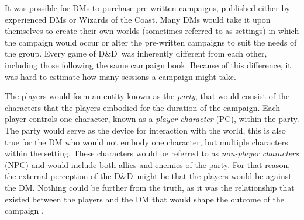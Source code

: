 \documentclass[final]{cmpreport}
\newcommand{\WotC}{Wizards of the Coast}
\newcommand{\dnd}{D\&D}
\begin{document}
			It was possible for DMs to purchase pre-written campaigns, published either by experienced DMs or \WotC. Many DMs would take it upon themselves to create their own worlds (sometimes referred to as settings) in which the campaign would occur or alter the pre-written campaigns to suit the needs of the group. Every game of \dnd \ was inherently different from each other, including those following the same campaign book. Because of this difference, it was hard to estimate how many sessions a campaign might take. 
			
			The players would form an entity known as the \emph{party}, that would consist of the characters that the players embodied for the duration of the campaign. Each player controls one character, known as a \emph{player character} (PC), within the party. The party would serve as the device for interaction with the world, this is also true for the DM who would not embody one character, but multiple characters within the setting. These characters would be referred to as \emph{non-player characters} (NPC) and would include both allies and enemies of the party. For that reason, the external perception of the \dnd \ might be that the players would be against the DM. Nothing could be further from the truth, as it was the relationship that existed between the players and the DM that would shape the outcome of the campaign \citep{DnDPeople}.
			
\end{document}
